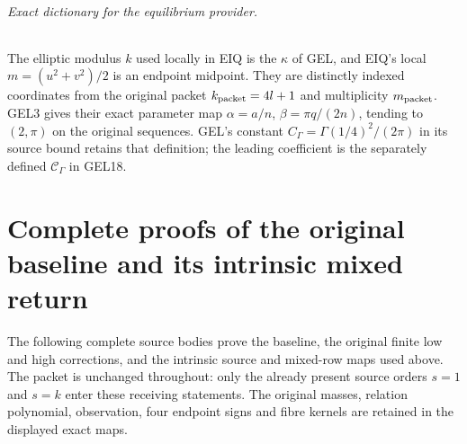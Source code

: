\documentclass[11pt,a4paper]{article}
\begin{document}
\paragraph{Exact dictionary for the equilibrium provider.}
The elliptic modulus $k$ used locally in EIQ is the $\kappa$ of GEL,
and EIQ's local $m=(u^2+v^2)/2$ is an endpoint midpoint. They are
distinctly indexed coordinates from the original packet
$k_{\rm packet}=4l+1$ and multiplicity $m_{\rm packet}$.
GEL3 gives their exact parameter map
$\alpha=a/n$, $\beta=\pi q/(2n)$, tending to $(2,\pi)$ on
the original sequences. GEL's constant $C_\Gamma=\Gamma(1/4)^2/(2\pi)$
in its source bound retains that definition; the leading coefficient
is the separately defined $\mathcal C_\Gamma$ in GEL18.





\clearpage
\part*{Complete proofs of the original baseline and its intrinsic mixed return}
The following complete source bodies prove the baseline, the original
finite low and high corrections, and the intrinsic source and mixed-row
maps used above. The packet is unchanged throughout: only the already
present source orders $s=1$ and $s=k$ enter these receiving statements.
The original masses, relation polynomial, observation, four endpoint
signs and fibre kernels are retained in the displayed exact maps.










\end{document}
